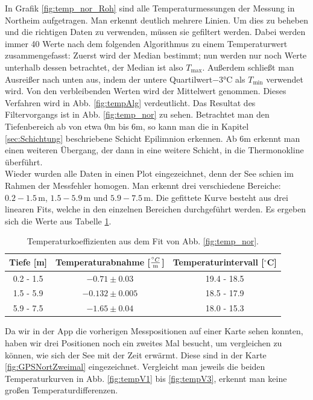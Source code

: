 \documentclass[12pt,a4paper,titlepage,headinclude,bibtotoc]{scrartcl}
\numberwithin{equation}{subsection}
\begin{document}
In Grafik \ref{fig:temp_nor_Roh} sind alle Temperaturmessungen der Messung in Northeim aufgetragen.
Man erkennt deutlich mehrere Linien.
Um dies zu beheben und die richtigen Daten zu verwenden, müssen sie gefiltert werden.
Dabei werden immer 40 Werte nach dem folgenden Algorithmus zu einem Temperaturwert zusammengefasst: 
Zuerst wird der Median bestimmt; nun werden nur noch Werte unterhalb dessen betrachtet, der Median ist also $T_\text{max}$. 
Außerdem schließt man Ausreißer nach unten aus, indem der untere Quartilwert$-3\si{\celsius}$ als $T_\text{min}$ verwendet wird.
Von den verbleibenden Werten wird der Mittelwert genommen.
Dieses Verfahren wird in Abb. \ref{fig:tempAlg} verdeutlicht.
Das Resultat des Filtervorgangs ist in Abb. \ref{fig:temp_nor} zu sehen.
Betrachtet man den Tiefenbereich ab von etwa 0\si{\meter} bis 6\si{\meter}, so kann man die in Kapitel \ref{sec:Schichtung} beschriebene Schicht Epilimnion erkennen.
Ab 6\si{\meter} erkennt man einen weiteren Übergang, der dann in eine weitere Schicht, in die Thermonokline überführt.\\
Wieder wurden alle Daten in einen Plot eingezeichnet, denn der See schien  im Rahmen der Messfehler homogen.
Man erkennt drei verschiedene Bereiche: $0.2-1.5\,$m, $1.5-5.9\,$m und $5.9-7.5\,$m.
Die gefittete Kurve besteht aus drei linearen Fits, welche in den einzelnen Bereichen durchgeführt werden.
Es ergeben sich die Werte aus Tabelle \ref{tab:tempTabNor}.
\begin{table}[!htb]
\centering
\begin{tabular}{|c||c|c|}
\hline
Tiefe [m] & Temperaturabnahme [$\frac{^\circ C}{\text m}$] & Temperaturintervall [$^\circ$C]\\\hline\hline
0.2 - 1.5 & $-0.71\pm  0.03$	& 19.4 - 18.5 \\
1.5 - 5.9 & $-0.132\pm 0.005$	& 18.5 - 17.9 \\
5.9 - 7.5 & $-1.65\pm 0.04$	& 18.0 - 15.3 \\\hline
\end{tabular}
\caption{Temperaturkoeffizienten aus dem Fit von Abb. \ref{fig:temp_nor}.}
\label{tab:tempTabNor}
\end{table}
Da wir in der App die vorherigen Messpositionen auf einer Karte sehen konnten, haben wir drei Positionen noch ein zweites Mal besucht, um vergleichen zu können, wie sich der See mit der Zeit erwärmt.
Diese sind in der Karte \ref{fig:GPSNortZweimal} eingezeichnet.
Vergleicht man jeweils die beiden Temperaturkurven in Abb. \ref{fig:tempV1} bis \ref{fig:tempV3}, erkennt man keine großen Temperaturdifferenzen.
\end{document}
